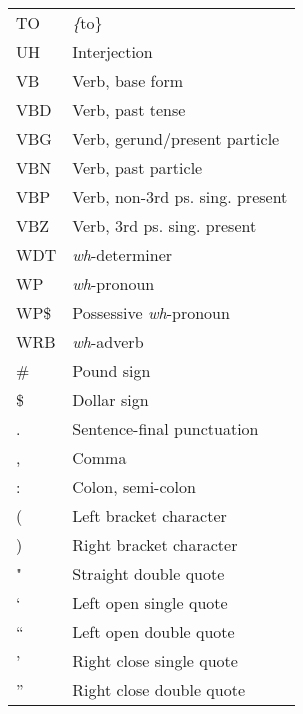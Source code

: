\begin{table}[!htbp]
\begin{tabu}{ll}
TO   & \textit\{to\}                         \\
UH   & Interjection                          \\
VB   & Verb, base form                       \\
VBD  & Verb, past tense                      \\
VBG  & Verb, gerund/present particle         \\
VBN  & Verb, past particle                   \\
VBP  & Verb, non-3rd ps. sing. present       \\
VBZ  & Verb, 3rd ps. sing. present           \\
WDT  & \textit{wh}-determiner                \\
WP   & \textit{wh}-pronoun                   \\
WP\$ & Possessive \textit{wh}-pronoun        \\
WRB  & \textit{wh}-adverb                    \\
\#   & Pound sign                            \\
\$   & Dollar sign                           \\
.    & Sentence-final punctuation            \\
,    & Comma                                 \\
:    & Colon, semi-colon                     \\
(    & Left bracket character                \\
)    & Right bracket character               \\
"    & Straight double quote                 \\
`    & Left open single quote                \\
``   & Left open double quote                \\
'    & Right close single quote              \\
''   & Right close double quote             
\end{tabu}
\end{table}